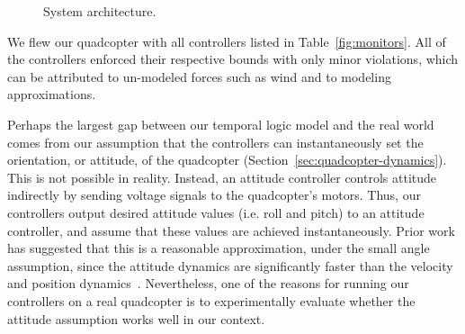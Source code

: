 \begin{figure}[t]
  \centering

     \caption{System architecture.}
     \label{fig:emsoft-arch}
\end{figure}

We flew our quadcopter with all controllers listed in
Table~\ref{fig:monitors}.  All of the controllers enforced their
respective bounds with only minor violations, which can be attributed to
un-modeled forces such as wind and to modeling approximations.

Perhaps the largest gap between our temporal logic model and the real world
comes from our assumption that the controllers can instantaneously set the
orientation, or attitude, of the quadcopter
(Section~\ref{sec:quadcopter-dynamics}).  This is not possible in reality.
Instead, an attitude controller controls attitude indirectly by sending
voltage signals to the quadcopter's motors.  Thus, our controllers output
desired attitude values (i.e. roll and pitch) to an attitude controller,
and assume that these values are achieved instantaneously.  Prior work has
suggested that this is a reasonable approximation, under the small angle
assumption, since the attitude dynamics are significantly faster than the
velocity and position dynamics~\cite{Gillula2011}.  Nevertheless, one of
the reasons for running our controllers on a real quadcopter is to
experimentally evaluate whether the attitude assumption works well in our
context.

